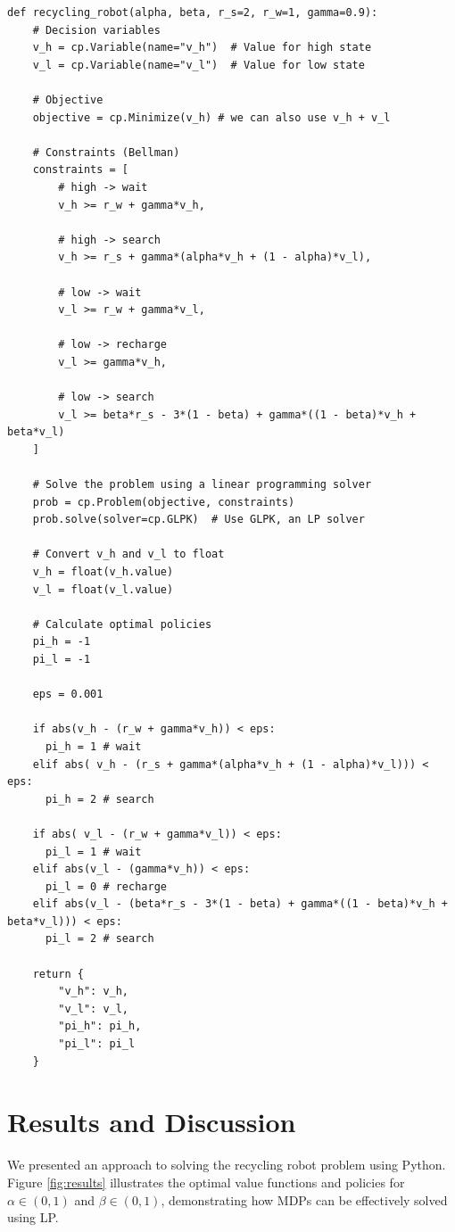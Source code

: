 \documentclass[12pt,a4paper]{article}
\begin{document}
\begin{lstlisting}[caption=Solving the problem as an LP in Python.]
def recycling_robot(alpha, beta, r_s=2, r_w=1, gamma=0.9):
    # Decision variables
    v_h = cp.Variable(name="v_h")  # Value for high state
    v_l = cp.Variable(name="v_l")  # Value for low state

    # Objective
    objective = cp.Minimize(v_h) # we can also use v_h + v_l

    # Constraints (Bellman)
    constraints = [
        # high -> wait
        v_h >= r_w + gamma*v_h, 

        # high -> search
        v_h >= r_s + gamma*(alpha*v_h + (1 - alpha)*v_l),

        # low -> wait
        v_l >= r_w + gamma*v_l, 

        # low -> recharge
        v_l >= gamma*v_h, 

        # low -> search
        v_l >= beta*r_s - 3*(1 - beta) + gamma*((1 - beta)*v_h + beta*v_l) 
    ]

    # Solve the problem using a linear programming solver
    prob = cp.Problem(objective, constraints)
    prob.solve(solver=cp.GLPK)  # Use GLPK, an LP solver

    # Convert v_h and v_l to float
    v_h = float(v_h.value)
    v_l = float(v_l.value)

    # Calculate optimal policies
    pi_h = -1
    pi_l = -1

    eps = 0.001

    if abs(v_h - (r_w + gamma*v_h)) < eps:
      pi_h = 1 # wait
    elif abs( v_h - (r_s + gamma*(alpha*v_h + (1 - alpha)*v_l))) < eps:
      pi_h = 2 # search
    
    if abs( v_l - (r_w + gamma*v_l)) < eps:
      pi_l = 1 # wait
    elif abs(v_l - (gamma*v_h)) < eps:
      pi_l = 0 # recharge
    elif abs(v_l - (beta*r_s - 3*(1 - beta) + gamma*((1 - beta)*v_h + beta*v_l))) < eps:
      pi_l = 2 # search

    return {
        "v_h": v_h,
        "v_l": v_l,
        "pi_h": pi_h,
        "pi_l": pi_l
    }
\end{lstlisting}

\section{Results and Discussion}
We presented an approach to solving the recycling robot problem using Python. Figure \ref{fig:results} illustrates the optimal value functions and policies for \(\alpha \in (0,1)\) and \(\beta \in (0,1)\), demonstrating how MDPs can be effectively solved using LP. 
\end{document}
